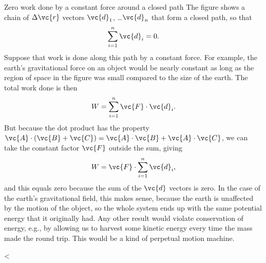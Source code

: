 \begin{eg}{Zero work done by a constant force around a closed path}\label{eg:zero-work-around-closed-path}
The figure shows a chain of $\Delta\vc{r}$ vectors $\vc{d}_1$, \ldots $\vc{d}_n$ that form a closed
path, so that
\begin{equation*}
  \sum_{i=1}^n \vc{d}_i = 0.
\end{equation*}
Suppose that work is done along this path by a constant force. For example, the earth's gravitational
force on an object would be nearly constant as long as the region of space in the figure was small
compared to the size of the earth. The total work done is then
\begin{equation*}
  W = \sum_{i=1}^n \vc{F}\cdot\vc{d}_i.
\end{equation*}
But because the dot product has the property $\vc{A}\cdot(\vc{B}+\vc{C}) = \vc{A}\cdot\vc{B}+\vc{A}\cdot\vc{C}$,
we can take the constant factor $\vc{F}$ outside the sum, giving
\begin{equation*}
  W = \vc{F}\cdot\sum_{i=1}^n \vc{d}_i,
\end{equation*}
and this equals zero because the sum of the $\vc{d}$ vectors is zero. In the case of the earth's gravitational field,
this makes sense, because the earth is unaffected by the motion of the object, so the whole system ends up
with the same potential energy that it originally had. Any other result would violate conservation of energy,
e.g., by allowing us to harvest some kinetic energy every time the mass made the round trip. This would be
a kind of perpetual motion machine.
\end{eg}


<%
